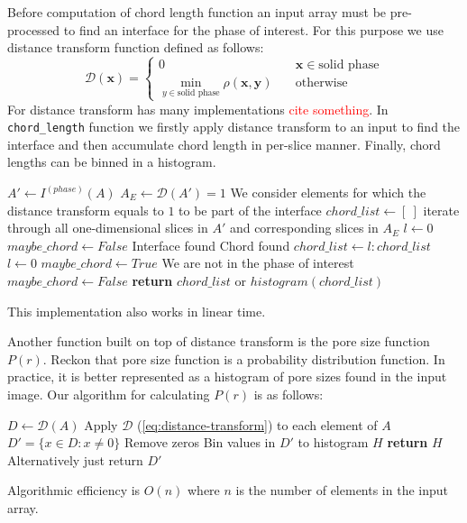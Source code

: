 \documentclass[reprint,amsmath,amssymb,aps,pre,showkeys,showpacs,nofootinbib]{revtex4-1}
\newcommand{\code}[1]{\colorbox{light-gray}{\texttt{#1}}}
\begin{document}
Before computation of chord length function an input array must be pre-processed
to find an interface for the phase of interest. For this purpose we use
distance transform function defined as follows:
\begin{equation}
  \mathcal{D}(\bm{x})= \left\{
  \begin{array}{ll}
    0 & \quad \bm{x} \in \text{solid phase} \\
    \min\limits_{y \in \text{solid phase}} \rho(\bm{x},\bm{y}) & \quad \text{otherwise}
  \end{array}
\right. \label{eq:distance-transform}
\end{equation}
For distance transform has many implementations \textcolor{red}{cite something}. In \code{chord\_length} function we
firstly apply distance transform to an input to find the interface and then
accumulate chord length in per-slice manner. Finally, chord lengths can be binned
in a histogram.
\begin{algorithmic}[1]
    \State $A' \gets I^{(phase)}(A)$
    \State $A_E \gets \mathcal{D}(A') = 1$
    \Comment We consider elements for which the distance transform equals to $1$
    to be part of the interface
    \State $chord\_list \gets [\ ]$
      \Comment iterate through all one-dimensional slices in $A'$ and
      corresponding slices in $A_E$
      \State $l \gets 0$
      \State $maybe\_chord \gets False$
          \Comment Interface found
            \Comment Chord found
            \State $chord\_list \gets l:chord\_list$
          \EndIf
          \State $l \gets 0$
          \State $maybe\_chord \gets True$
          \Comment We are not in the phase of interest
          \State $maybe\_chord \gets False$
        \EndIf
      \EndFor
    \EndFor
    \State \textbf{return} $chord\_list$ or $histogram(chord\_list)$
  \EndProcedure
\end{algorithmic}
This implementation also works in linear time.

Another function built on top of distance transform is the pore size function
$P(r)$. Reckon that pore size function is a probability distribution
function. In practice, it is better represented as a histogram of pore sizes
found in the input image. Our algorithm for calculating $P(r)$ is as follows:
\begin{algorithmic}[1]
    \State $D \gets \mathcal{D}(A)$
    \Comment Apply $\mathcal{D}$ (\cref{eq:distance-transform}) to each element of $A$
    \State $D' = \{ x \in D: x \ne 0\}$
    \Comment Remove zeros
    \State Bin values in $D'$ to histogram $H$
    \State \textbf{return} $H$
    \Comment Alternatively just return $D'$
  \EndProcedure
\end{algorithmic}
Algorithmic efficiency is $O(n)$ where $n$ is the number of elements in the
input array.
\end{document}
